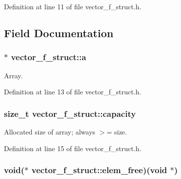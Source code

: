 Definition at line 11 of file vector\-\_\-f\-\_\-struct.\-h.



\subsection{Field Documentation}
\hypertarget{structvector__f__struct_aa08e7a5eb34ec6d49b989d92cd5c1cb0}{
\subsubsection[{a}]{$\ast$ vector\-\_\-f\-\_\-struct\-::a}}\label{structvector__f__struct_aa08e7a5eb34ec6d49b989d92cd5c1cb0}


Array. 



Definition at line 13 of file vector\-\_\-f\-\_\-struct.\-h.

\hypertarget{structvector__f__struct_a1345918800980510bc383ee375726372}{
\subsubsection[{capacity}]{\setlength{\rightskip}{0pt plus 5cm}size\-\_\-t vector\-\_\-f\-\_\-struct\-::capacity}}\label{structvector__f__struct_a1345918800980510bc383ee375726372}


Allocated size of array; always $>$= size. 



Definition at line 15 of file vector\-\_\-f\-\_\-struct.\-h.

\hypertarget{structvector__f__struct_a5464311934fa85ead14cdfe90b9efdc0}{
\subsubsection[{elem\-\_\-free}]{\setlength{\rightskip}{0pt plus 5cm}void($\ast$ vector\-\_\-f\-\_\-struct\-::elem\-\_\-free)(void $\ast$)}}\label{structvector__f__struct_a5464311934fa85ead14cdfe90b9efdc0}


